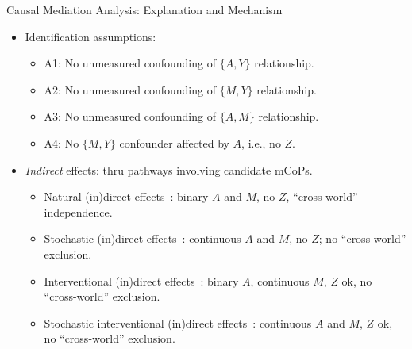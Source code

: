 \documentclass{beamer}
\begin{document}
\begin{frame}[c]{Causal Mediation Analysis: Explanation and Mechanism}

\begin{center}
\begin{itemize}
  \itemsep 10pt
  \item Identification assumptions:
      \begin{itemize}
          \item A1: No unmeasured confounding of $\{A, Y\}$ relationship.
          \item A2: No unmeasured confounding of $\{M, Y\}$ relationship.
          \item A3: No unmeasured confounding of $\{A, M\}$ relationship.
        \item A4: No $\{M, Y\}$ confounder affected by $A$, i.e., no $Z$.
      \end{itemize}
  \item \textit{Indirect} effects: thru pathways involving candidate mCoPs.
      \begin{itemize}
          \item Natural (in)direct effects~\citep{robins1992identifiability,
              pearl2013direct}: binary $A$ and $M$, no $Z$, ``cross-world''
              independence.
          \item Stochastic (in)direct effects~\citep{diaz2020causal}:
          continuous $A$ and $M$, no $Z$; no ``cross-world'' exclusion.
          \item Interventional (in)direct effects~\citep{diaz2020nonparametric}:
          binary $A$, continuous $M$, $Z$ ok, no ``cross-world'' exclusion.
          \item Stochastic interventional (in)direct
            effects~\citep{hejazi2020nonparametric}:
          continuous $A$ and $M$, $Z$ ok, no ``cross-world'' exclusion.
      \end{itemize}

\end{itemize}
\end{center}


\end{frame}
\end{document}
